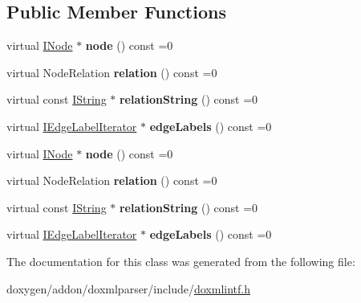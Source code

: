 \subsection*{Public Member Functions}
\begin{DoxyCompactItemize}
\item 
\mbox{\label{class_i_child_node_a287bf2f26b3db29d00513ed4cee5141d}} 
virtual \mbox{\hyperlink{class_i_node}{I\+Node}} $\ast$ {\bfseries node} () const =0
\item 
\mbox{\label{class_i_child_node_a045cfcd9bd158c969d3bca2e61b6ddbc}} 
virtual Node\+Relation {\bfseries relation} () const =0
\item 
\mbox{\label{class_i_child_node_ade6412f9a9f1913a661b91eb710fb3a9}} 
virtual const \mbox{\hyperlink{class_i_string}{I\+String}} $\ast$ {\bfseries relation\+String} () const =0
\item 
\mbox{\label{class_i_child_node_afff75cb6461def5241bc2f1bd96d9385}} 
virtual \mbox{\hyperlink{class_i_edge_label_iterator}{I\+Edge\+Label\+Iterator}} $\ast$ {\bfseries edge\+Labels} () const =0
\item 
\mbox{\label{class_i_child_node_a287bf2f26b3db29d00513ed4cee5141d}} 
virtual \mbox{\hyperlink{class_i_node}{I\+Node}} $\ast$ {\bfseries node} () const =0
\item 
\mbox{\label{class_i_child_node_a045cfcd9bd158c969d3bca2e61b6ddbc}} 
virtual Node\+Relation {\bfseries relation} () const =0
\item 
\mbox{\label{class_i_child_node_ade6412f9a9f1913a661b91eb710fb3a9}} 
virtual const \mbox{\hyperlink{class_i_string}{I\+String}} $\ast$ {\bfseries relation\+String} () const =0
\item 
\mbox{\label{class_i_child_node_afff75cb6461def5241bc2f1bd96d9385}} 
virtual \mbox{\hyperlink{class_i_edge_label_iterator}{I\+Edge\+Label\+Iterator}} $\ast$ {\bfseries edge\+Labels} () const =0
\end{DoxyCompactItemize}


The documentation for this class was generated from the following file\+:\begin{DoxyCompactItemize}
\item 
doxygen/addon/doxmlparser/include/\mbox{\hyperlink{include_2doxmlintf_8h}{doxmlintf.\+h}}\end{DoxyCompactItemize}
